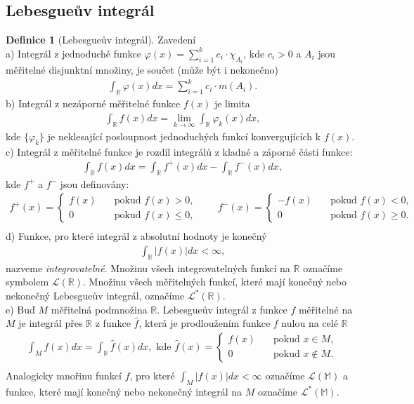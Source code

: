\documentclass[a4]{report}
\theoremstyle{definition}
\newtheorem{definition}{Definice}[section]
\begin{document}
{\subsection{Lebesgueův integrál}
\begin{definition}[Lebesgueův integrál]Zavedení\\
a) Integrál z jednoduché funkce $\varphi(x)=\sum_{i=1}^k c_i\cdot  \chi_{A_i}$, kde $c_i>0$ a $A_i$ jsou měřitelné disjunktní množiny, je součet (může být i nekonečno)
\begin{align*}
\int_\mathbb{R}\varphi(x)dx=\sum_{i=1}^k c_i \cdot m(A_i).
\end{align*}
b) Integrál z nezáporné měřitelné funkce $f(x)$ je limita
\begin{align*}
\int_\mathbb{R}f(x)dx=\lim_{k\rightarrow\infty}\int_\mathbb{R}\varphi_k(x)dx,
\end{align*}
kde $\{\varphi_k\}$ je neklesající posloupnost jednoduchých funkcí konvergujících k $f(x)$.\\
c) Integrál z měřitelné funkce je rozdíl integrálů z kladné a záporné části funkce:
\begin{align*}
\int_\mathbb{R} f(x)dx=\int_\mathbb{R} f^+(x)dx-\int_\mathbb{R}f^-(x)dx,
\end{align*}
kde $f^+$ a $f^-$ jsou definovány:
\begin{align*}
f^+(x)=\begin{cases}
f(x)\quad &\text{pokud } f(x)>0,\\0 \quad &\text{pokud } f(x)\leq 0,
\end{cases}\qquad
f^-(x)=\begin{cases}
-f(x)\quad &\text{pokud } f(x)<0,\\0 \quad &\text{pokud } f(x)\geq 0.
\end{cases}\\
\end{align*}
d) Funkce, pro které integrál z absolutní hodnoty je konečný
\begin{align*}
\int_\mathbb{R}|f(x)|dx<\infty,
\end{align*}
nazveme \textit{integrovatelné}. Množinu všech integrovatelných funkcí na $\mathbb{R}$ označíme symbolem $\mathscr{L}(\mathbb{R})$. Množinu všech měřitelných funkcí, které mají konečný nebo nekonečný Lebesgueův integrál, označíme $\mathscr{L}^*(\mathbb{R})$.\\
e) Buď $M$ měřitelná podmnožina $\mathbb{R}$. Lebesgueův integrál z funkce $f$ měřitelné na $M$ je integrál přes $\mathbb{R}$ z funkce $\hat{f}$, která je prodloužením funkce $f$ nulou na celé $\mathbb{R}$
\begin{align*}
\int_M f(x) dx=\int_\mathbb{R}\hat{f}(x)dx,\text{ kde } \hat{f}(x)=\begin{cases}
f(x)\quad &\text{pokud } x\in M,\\0 \quad &\text{pokud } x\notin M.
\end{cases}\\
\end{align*}
Analogicky mnořinu funkcí $f$, pro které $\int_M |f(x)|dx<\infty$ označíme $\mathscr{L}(\mathbb{M})$ a funkce, které mají konečný nebo nekonečný integrál na $M$ označíme $\mathscr{L}^*(\mathbb{M})$.
\end{definition}
}
\end{document}

